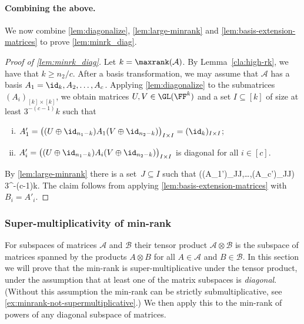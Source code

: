 \paragraph{Combining the above.} \!We now combine \autoref{lem:diagonalize}, \autoref{lem:large-minrank} and \autoref{lem:basis-extension-matrices} to prove \autoref{lem:minrk_diag}.

\begin{proof}[Proof of \autoref{lem:minrk_diag}]
Let $k = \maxrank(\mathcal A)$.
    By Lemma~\ref{cla:high-rk}, we have that $k \geq n_2/c$.
    After a basis transformation, we may assume that $\mathcal A$ has a basis $A_1 = \id_k,A_2,\dots,A_c$.
    Applying \autoref{lem:diagonalize} to the submatrices $(A_i)_{[k]\times [k]}$, we obtain matrices $U,V\in \GL(\FF^k)$ and a set $I\subseteq[k]$ of size at least $3^{-(c-1)}k$ such that
    \begin{enumerate}[(i)]
        \item $A_1' = \big((U\oplus \id_{n_1 - k})A_1(V\oplus \id_{n_2 - k})\big)_{I\times I} = (\id_k)_{I\times I}$;
    \item $A_i' = \big((U\oplus \id_{n_1 - k})A_i(V\oplus \id_{n_2 - k})\big)_{I\times I}$ is diagonal for all $i\in [c]$.
    \end{enumerate}
    By \autoref{lem:large-minrank} there is a set~$J\subseteq I$ such that
    \beqn
    \minrnk\big((A_1')_{J\times J},\dots,(A_c')_{J\times J}\big) \geq {} 3^{-(c-1)}k. %
    \eeqn
    The claim follows from applying \autoref{lem:basis-extension-matrices} with $B_i = A'_i$.
\end{proof}

\subsubsection{Super-multiplicativity of min-rank}\label{subsec:supermult}

For subspaces of matrices $\mathcal{A}$ and $\mathcal{B}$ their tensor product $\mathcal{A} \otimes \mathcal{B}$ is the subspace of matrices spanned by the products $A \otimes B$ for all $A \in \mathcal{A}$ and $B \in \mathcal{B}$.
In this section we will prove that the min-rank is super-multiplicative under the tensor product, under the assumption that at least one of the matrix subspaces is \emph{diagonal}. (Without this assumption the min-rank can be strictly submultiplicative, see \autoref{ex:minrank-not-supermultiplicative}.)
We then apply this to the min-rank of powers of any diagonal subspace of matrices.

